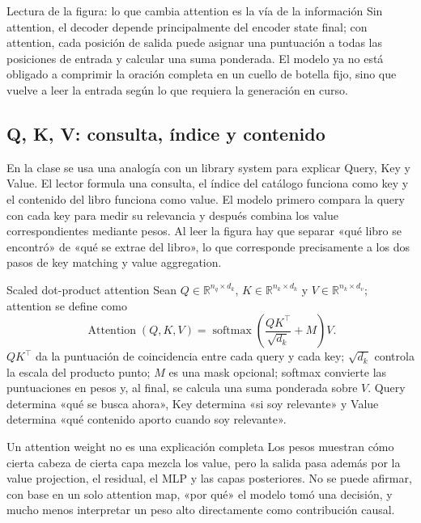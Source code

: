 \begin{knowledgebox}{Lectura de la figura: lo que cambia attention es la vía de la información}
Sin attention, el decoder depende principalmente del encoder state final; con attention, cada posición de salida puede asignar una puntuación a todas las posiciones de entrada y calcular una suma ponderada. El modelo ya no está obligado a comprimir la oración completa en un cuello de botella fijo, sino que vuelve a leer la entrada según lo que requiera la generación en curso.
\end{knowledgebox}

\subsection{Q, K, V: consulta, índice y contenido}

En la clase se usa una analogía con un library system para explicar Query, Key y Value. El lector formula una consulta, el índice del catálogo funciona como key y el contenido del libro funciona como value. El modelo primero compara la query con cada key para medir su relevancia y después combina los value correspondientes mediante pesos. Al leer la figura hay que separar «qué libro se encontró» de «qué se extrae del libro», lo que corresponde precisamente a los dos pasos de key matching y value aggregation.


\begin{importantbox}{Scaled dot-product attention}
Sean $Q\in\mathbb{R}^{n_q\times d_k}$, $K\in\mathbb{R}^{n_k\times d_k}$ y $V\in\mathbb{R}^{n_k\times d_v}$; attention se define como
\[
\operatorname{Attention}(Q,K,V)=\operatorname{softmax}\!\left(\frac{QK^\top}{\sqrt{d_k}}+M\right)V.
\]
$QK^\top$ da la puntuación de coincidencia entre cada query y cada key; $\sqrt{d_k}$ controla la escala del producto punto; $M$ es una mask opcional; softmax convierte las puntuaciones en pesos y, al final, se calcula una suma ponderada sobre $V$. Query determina «qué se busca ahora», Key determina «si soy relevante» y Value determina «qué contenido aporto cuando soy relevante».
\end{importantbox}

\begin{warningbox}{Un attention weight no es una explicación completa}
Los pesos muestran cómo cierta cabeza de cierta capa mezcla los value, pero la salida pasa además por la value projection, el residual, el MLP y las capas posteriores. No se puede afirmar, con base en un solo attention map, «por qué» el modelo tomó una decisión, y mucho menos interpretar un peso alto directamente como contribución causal.
\end{warningbox}

